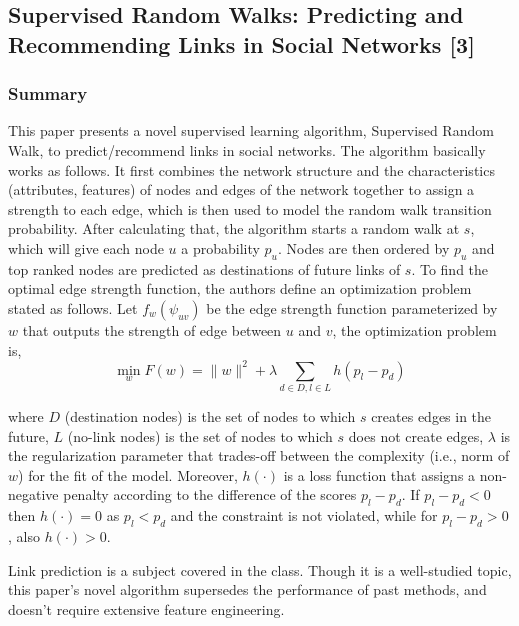 \documentclass{article}
\begin{document}
\subsection{Supervised Random Walks: Predicting and Recommending Links in Social Networks [3]}

\subsubsection{Summary}
This paper presents a novel supervised learning algorithm, Supervised Random Walk, to predict/recommend links in social networks. The algorithm basically works as follows. It first combines the network structure and the characteristics (attributes, features) of nodes and edges of the network together to assign a strength to each edge, which is then used to model the random walk transition probability. After calculating that, the algorithm starts a random walk at $s$, which will give each node $u$ a probability $p_u$. Nodes are then ordered by $p_u$ and top ranked nodes are predicted as destinations of future links of $s$. To find the optimal edge strength function, the authors define an optimization problem stated as follows. Let $f_w(\psi_{uv})$ be the edge strength function parameterized by $w$ that outputs the strength of edge between $u$ and $v$, the optimization problem is,
\begin{equation}
\min_w F(w)=\parallel w\parallel^2+\lambda\sum_{d\in D, l\in L}h(p_l-p_d)
\end{equation}

where $D$ (destination nodes) is the set of nodes to which $s$ creates edges in the future, $L$ (no-link nodes) is the set of nodes to which $s$ does not create edges, $λ$ is the regularization parameter that trades-off between the complexity (i.e., norm of $w$) for the fit of the model. Moreover, $h(\cdot)$ is a loss function that assigns a non-negative penalty according to the difference of the scores $p_l - p_d$. If $p_l - p_d<0$ then $h(\cdot)=0$ as $p_l <p_d$ and the constraint is not violated, while for $p_l - p_d > 0$, also $h(\cdot) > 0$.

Link prediction is a subject covered in the class. Though it is a well-studied topic, this paper’s novel algorithm supersedes the performance of past methods, and doesn’t require extensive feature engineering. 
\end{document}
